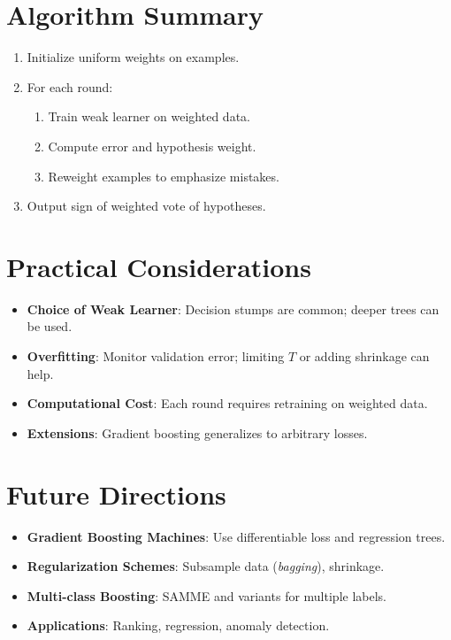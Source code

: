 \documentclass[11pt]{article}
\begin{document}
\section{Algorithm Summary}
\begin{enumerate}
  \item Initialize uniform weights on examples.
  \item For each round:
    \begin{enumerate}
      \item Train weak learner on weighted data.
      \item Compute error and hypothesis weight.
      \item Reweight examples to emphasize mistakes.
    \end{enumerate}
  \item Output sign of weighted vote of hypotheses.
\end{enumerate}

\section{Practical Considerations}
\begin{itemize}
  \item \textbf{Choice of Weak Learner}: Decision stumps are common; deeper trees can be used.
  \item \textbf{Overfitting}: Monitor validation error; limiting $T$ or adding shrinkage can help.
  \item \textbf{Computational Cost}: Each round requires retraining on weighted data.
  \item \textbf{Extensions}: Gradient boosting generalizes to arbitrary losses.
\end{itemize}

\section{Future Directions}
\begin{itemize}
  \item \textbf{Gradient Boosting Machines}: Use differentiable loss and regression trees.
  \item \textbf{Regularization Schemes}: Subsample data (\emph{bagging}), shrinkage.
  \item \textbf{Multi-class Boosting}: SAMME and variants for multiple labels.
  \item \textbf{Applications}: Ranking, regression, anomaly detection.
\end{itemize}
\end{document}
